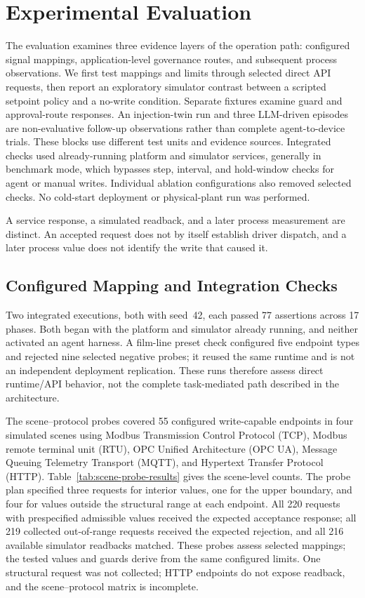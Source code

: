 \section{Experimental Evaluation}
\label{sec:eval}
The evaluation examines three evidence layers of the operation path: configured signal mappings, application-level governance routes, and subsequent process observations. We first test mappings and limits through selected direct API requests, then report an exploratory simulator contrast between a scripted setpoint policy and a no-write condition. Separate fixtures examine guard and approval-route responses. An injection-twin run and three LLM-driven episodes are non-evaluative follow-up observations rather than complete agent-to-device trials. These blocks use different test units and evidence sources. Integrated checks used already-running platform and simulator services, generally in benchmark mode, which bypasses step, interval, and hold-window checks for agent or manual writes. Individual ablation configurations also removed selected checks. No cold-start deployment or physical-plant run was performed.

A service response, a simulated readback, and a later process measurement are distinct. An accepted request does not by itself establish driver dispatch, and a later process value does not identify the write that caused it.

\subsection{Configured Mapping and Integration Checks}
\label{sec:eval-mapping}
Two integrated executions, both with seed~42, each passed 77 assertions across 17 phases. Both began with the platform and simulator already running, and neither activated an agent harness. A film-line preset check configured five endpoint types and rejected nine selected negative probes; it reused the same runtime and is not an independent deployment replication. These runs therefore assess direct runtime/API behavior, not the complete task-mediated path described in the architecture.

The scene--protocol probes covered 55 configured write-capable endpoints in four simulated scenes using Modbus Transmission Control Protocol (TCP), Modbus remote terminal unit (RTU), OPC Unified Architecture (OPC UA), Message Queuing Telemetry Transport (MQTT), and Hypertext Transfer Protocol (HTTP). Table~\ref{tab:scene-probe-results} gives the scene-level counts. The probe plan specified three requests for interior values, one for the upper boundary, and four for values outside the structural range at each endpoint. All 220 requests with prespecified admissible values received the expected acceptance response; all 219 collected out-of-range requests received the expected rejection, and all 216 available simulator readbacks matched. These probes assess selected mappings; the tested values and guards derive from the same configured limits. One structural request was not collected; HTTP endpoints do not expose readback, and the scene--protocol matrix is incomplete.


